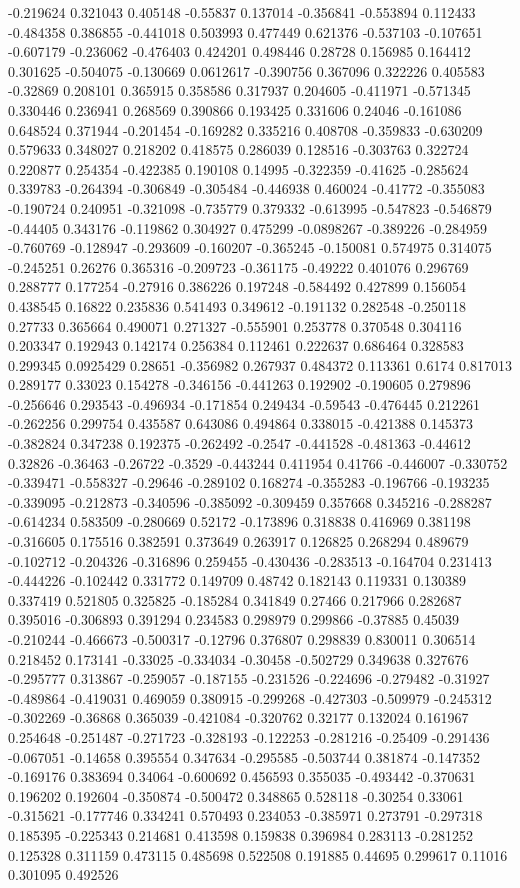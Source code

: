 -0.219624 0.321043 0.405148 -0.55837 0.137014 -0.356841 -0.553894 0.112433 -0.484358 0.386855 -0.441018 0.503993 0.477449 0.621376 -0.537103 -0.107651 -0.607179 -0.236062 -0.476403 0.424201 0.498446 0.28728 0.156985 0.164412 0.301625 -0.504075 -0.130669 0.0612617 -0.390756 0.367096 0.322226 0.405583 -0.32869 0.208101 0.365915 0.358586 0.317937 0.204605 -0.411971 -0.571345 0.330446 0.236941 0.268569 0.390866 0.193425 0.331606 0.24046 -0.161086 0.648524 0.371944 -0.201454 -0.169282 0.335216 0.408708 -0.359833 -0.630209 0.579633 0.348027 0.218202 0.418575 0.286039 0.128516 -0.303763 0.322724 0.220877 0.254354 -0.422385 0.190108 0.14995 -0.322359 -0.41625 -0.285624 0.339783 -0.264394 -0.306849 -0.305484 -0.446938 0.460024 -0.41772 -0.355083 -0.190724 0.240951 -0.321098 -0.735779 0.379332 -0.613995 -0.547823 -0.546879 -0.44405 0.343176 -0.119862 0.304927 0.475299 -0.0898267 -0.389226 -0.284959 -0.760769 -0.128947 -0.293609 -0.160207 -0.365245 -0.150081 0.574975 0.314075 -0.245251 0.26276 0.365316 -0.209723 -0.361175 -0.49222 0.401076 0.296769 0.288777 0.177254 -0.27916 0.386226 0.197248 -0.584492 0.427899 0.156054 0.438545 0.16822 0.235836 0.541493 0.349612 -0.191132 0.282548 -0.250118 0.27733 0.365664 0.490071 0.271327 -0.555901 0.253778 0.370548 0.304116 0.203347 0.192943 0.142174 0.256384 0.112461 0.222637 0.686464 0.328583 0.299345 0.0925429 0.28651 -0.356982 0.267937 0.484372 0.113361 0.6174 0.817013 0.289177 0.33023 0.154278 -0.346156 -0.441263 0.192902 -0.190605 0.279896 -0.256646 0.293543 -0.496934 -0.171854 0.249434 -0.59543 -0.476445 0.212261 -0.262256 0.299754 0.435587 0.643086 0.494864 0.338015 -0.421388 0.145373 -0.382824 0.347238 0.192375 -0.262492 -0.2547 -0.441528 -0.481363 -0.44612 0.32826 -0.36463 -0.26722 -0.3529 -0.443244 0.411954 0.41766 -0.446007 -0.330752 -0.339471 -0.558327 -0.29646 -0.289102 0.168274 -0.355283 -0.196766 -0.193235 -0.339095 -0.212873 -0.340596 -0.385092 -0.309459 0.357668 0.345216 -0.288287 -0.614234 0.583509 -0.280669 0.52172 -0.173896 0.318838 0.416969 0.381198 -0.316605 0.175516 0.382591 0.373649 0.263917 0.126825 0.268294 0.489679 -0.102712 -0.204326 -0.316896 0.259455 -0.430436 -0.283513 -0.164704 0.231413 -0.444226 -0.102442 0.331772 0.149709 0.48742 0.182143 0.119331 0.130389 0.337419 0.521805 0.325825 -0.185284 0.341849 0.27466 0.217966 0.282687 0.395016 -0.306893 0.391294 0.234583 0.298979 0.299866 -0.37885 0.45039 -0.210244 -0.466673 -0.500317 -0.12796 0.376807 0.298839 0.830011 0.306514 0.218452 0.173141 -0.33025 -0.334034 -0.30458 -0.502729 0.349638 0.327676 -0.295777 0.313867 -0.259057 -0.187155 -0.231526 -0.224696 -0.279482 -0.31927 -0.489864 -0.419031 0.469059 0.380915 -0.299268 -0.427303 -0.509979 -0.245312 -0.302269 -0.36868 0.365039 -0.421084 -0.320762 0.32177 0.132024 0.161967 0.254648 -0.251487 -0.271723 -0.328193 -0.122253 -0.281216 -0.25409 -0.291436 -0.067051 -0.14658 0.395554 0.347634 -0.295585 -0.503744 0.381874 -0.147352 -0.169176 0.383694 0.34064 -0.600692 0.456593 0.355035 -0.493442 -0.370631 0.196202 0.192604 -0.350874 -0.500472 0.348865 0.528118 -0.30254 0.33061 -0.315621 -0.177746 0.334241 0.570493 0.234053 -0.385971 0.273791 -0.297318 0.185395 -0.225343 0.214681 0.413598 0.159838 0.396984 0.283113 -0.281252 0.125328 0.311159 0.473115 0.485698 0.522508 0.191885 0.44695 0.299617 0.11016 0.301095 0.492526 